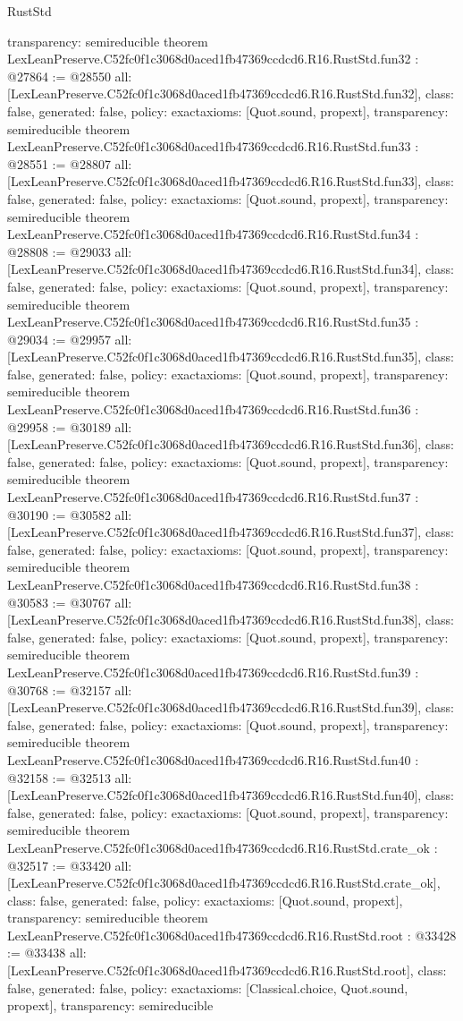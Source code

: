 \begin{lexlean}{RustStd}
\begin{coremodule}
{  transparency: semireducible
}
theorem LexLeanPreserve.C52fc0f1c3068d0aced1fb47369ccdcd6.R16.RustStd.fun32 : @27864 := @28550 {
  all: [LexLeanPreserve.C52fc0f1c3068d0aced1fb47369ccdcd6.R16.RustStd.fun32],
  class: false,
  generated: false,
  policy: exact{axioms: [Quot.sound, propext]},
  transparency: semireducible
}
theorem LexLeanPreserve.C52fc0f1c3068d0aced1fb47369ccdcd6.R16.RustStd.fun33 : @28551 := @28807 {
  all: [LexLeanPreserve.C52fc0f1c3068d0aced1fb47369ccdcd6.R16.RustStd.fun33],
  class: false,
  generated: false,
  policy: exact{axioms: [Quot.sound, propext]},
  transparency: semireducible
}
theorem LexLeanPreserve.C52fc0f1c3068d0aced1fb47369ccdcd6.R16.RustStd.fun34 : @28808 := @29033 {
  all: [LexLeanPreserve.C52fc0f1c3068d0aced1fb47369ccdcd6.R16.RustStd.fun34],
  class: false,
  generated: false,
  policy: exact{axioms: [Quot.sound, propext]},
  transparency: semireducible
}
theorem LexLeanPreserve.C52fc0f1c3068d0aced1fb47369ccdcd6.R16.RustStd.fun35 : @29034 := @29957 {
  all: [LexLeanPreserve.C52fc0f1c3068d0aced1fb47369ccdcd6.R16.RustStd.fun35],
  class: false,
  generated: false,
  policy: exact{axioms: [Quot.sound, propext]},
  transparency: semireducible
}
theorem LexLeanPreserve.C52fc0f1c3068d0aced1fb47369ccdcd6.R16.RustStd.fun36 : @29958 := @30189 {
  all: [LexLeanPreserve.C52fc0f1c3068d0aced1fb47369ccdcd6.R16.RustStd.fun36],
  class: false,
  generated: false,
  policy: exact{axioms: [Quot.sound, propext]},
  transparency: semireducible
}
theorem LexLeanPreserve.C52fc0f1c3068d0aced1fb47369ccdcd6.R16.RustStd.fun37 : @30190 := @30582 {
  all: [LexLeanPreserve.C52fc0f1c3068d0aced1fb47369ccdcd6.R16.RustStd.fun37],
  class: false,
  generated: false,
  policy: exact{axioms: [Quot.sound, propext]},
  transparency: semireducible
}
theorem LexLeanPreserve.C52fc0f1c3068d0aced1fb47369ccdcd6.R16.RustStd.fun38 : @30583 := @30767 {
  all: [LexLeanPreserve.C52fc0f1c3068d0aced1fb47369ccdcd6.R16.RustStd.fun38],
  class: false,
  generated: false,
  policy: exact{axioms: [Quot.sound, propext]},
  transparency: semireducible
}
theorem LexLeanPreserve.C52fc0f1c3068d0aced1fb47369ccdcd6.R16.RustStd.fun39 : @30768 := @32157 {
  all: [LexLeanPreserve.C52fc0f1c3068d0aced1fb47369ccdcd6.R16.RustStd.fun39],
  class: false,
  generated: false,
  policy: exact{axioms: [Quot.sound, propext]},
  transparency: semireducible
}
theorem LexLeanPreserve.C52fc0f1c3068d0aced1fb47369ccdcd6.R16.RustStd.fun40 : @32158 := @32513 {
  all: [LexLeanPreserve.C52fc0f1c3068d0aced1fb47369ccdcd6.R16.RustStd.fun40],
  class: false,
  generated: false,
  policy: exact{axioms: [Quot.sound, propext]},
  transparency: semireducible
}
theorem LexLeanPreserve.C52fc0f1c3068d0aced1fb47369ccdcd6.R16.RustStd.crate_ok : @32517 := @33420 {
  all: [LexLeanPreserve.C52fc0f1c3068d0aced1fb47369ccdcd6.R16.RustStd.crate_ok],
  class: false,
  generated: false,
  policy: exact{axioms: [Quot.sound, propext]},
  transparency: semireducible
}
theorem LexLeanPreserve.C52fc0f1c3068d0aced1fb47369ccdcd6.R16.RustStd.root : @33428 := @33438 {
  all: [LexLeanPreserve.C52fc0f1c3068d0aced1fb47369ccdcd6.R16.RustStd.root],
  class: false,
  generated: false,
  policy: exact{axioms: [Classical.choice, Quot.sound, propext]},
  transparency: semireducible
}


\end{coremodule}
\end{lexlean}
